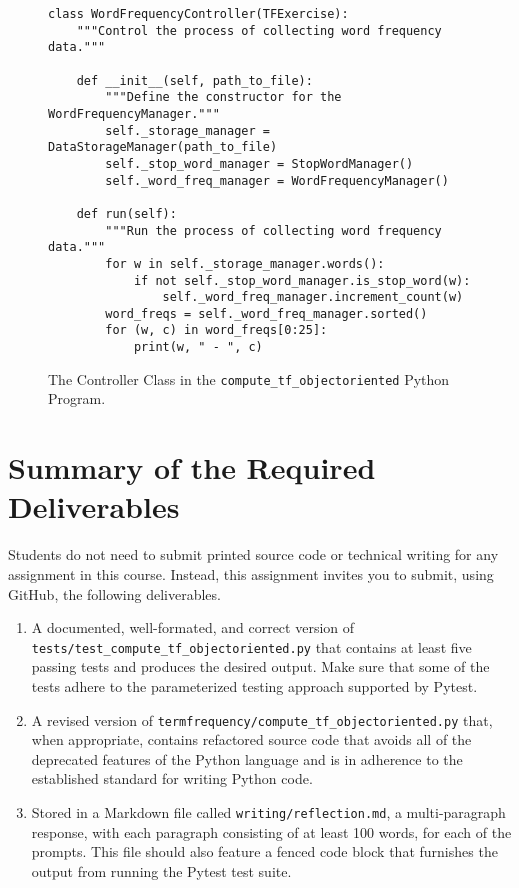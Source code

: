 \documentclass[11pt]{article}
\newcommand{\mainprogramsource}{\lstinline{termfrequency/compute_tf_objectoriented.py}}
\newcommand{\testprogramsource}{\lstinline{tests/test_compute_tf_objectoriented.py}}
\newcommand{\reflection}{\lstinline{writing/reflection.md}}
\begin{document}
\begin{figure}[t]
%
\begin{verbatim}
class WordFrequencyController(TFExercise):
    """Control the process of collecting word frequency data."""

    def __init__(self, path_to_file):
        """Define the constructor for the WordFrequencyManager."""
        self._storage_manager = DataStorageManager(path_to_file)
        self._stop_word_manager = StopWordManager()
        self._word_freq_manager = WordFrequencyManager()

    def run(self):
        """Run the process of collecting word frequency data."""
        for w in self._storage_manager.words():
            if not self._stop_word_manager.is_stop_word(w):
                self._word_freq_manager.increment_count(w)
        word_freqs = self._word_freq_manager.sorted()
        for (w, c) in word_freqs[0:25]:
            print(w, " - ", c)
\end{verbatim}
%
\vspace*{-.15in}
%
\caption{The Controller Class in the {\tt compute\_tf\_objectoriented} Python Program.}\label{fig:main}
%
\vspace*{-.1in}
%
\end{figure}

\section*{Summary of the Required Deliverables}

\noindent Students do not need to submit printed source code or technical
writing for any assignment in this course. Instead, this assignment invites you
to submit, using GitHub, the following deliverables.

\vspace*{-.25em}

\begin{enumerate}

\setlength{\itemsep}{0in}

\item A documented, well-formated, and correct version of \testprogramsource{}
  that contains at least five passing tests and produces the desired output.
  Make sure that some of the tests adhere to the parameterized testing approach
  supported by Pytest.

\item A revised version of \mainprogramsource{} that, when appropriate, contains
  refactored source code that avoids all of the deprecated features of the
  Python language and is in adherence to the established standard for writing
  Python code.

\item Stored in a Markdown file called \reflection{}, a multi-paragraph
  response, with each paragraph consisting of at least 100 words, for each of
  the prompts. This file should also feature a fenced code block that furnishes
  the output from running the Pytest test suite.

\end{enumerate}
\end{document}
